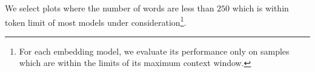 

We select plots where the number of words are less than $250$ which is within token limit of most models under consideration\footnote{For each embedding model, we evaluate its performance only on samples which are within the limits of its maximum context window.}. 


